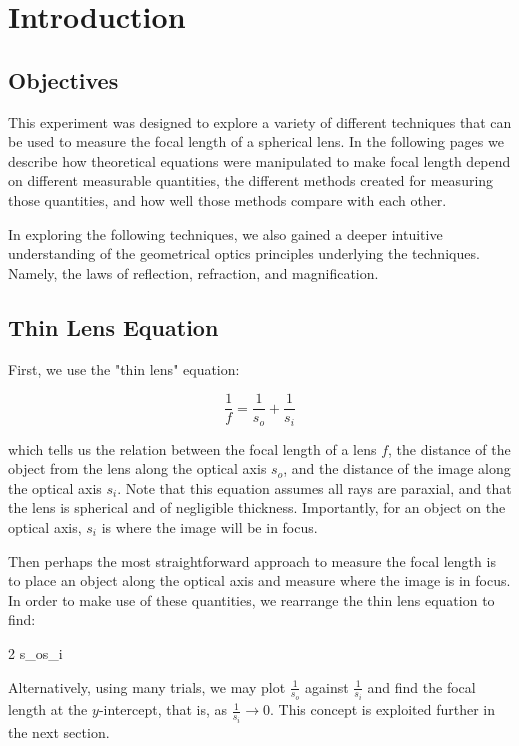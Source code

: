 \chapter{Introduction}

\section{Objectives}
This experiment was designed to explore a variety of different techniques that can be used to measure the focal length of a spherical lens. In the following pages we describe how theoretical equations were manipulated to make focal length depend on different measurable quantities, the different methods created for measuring those quantities, and how well those methods compare with each other.

In exploring the following techniques, we also gained a deeper intuitive understanding of the geometrical optics principles underlying the techniques. Namely, the laws of reflection, refraction, and magnification.

\section{Thin Lens Equation}
First, we use the "thin lens" equation:

\[\frac{1}{f} = \frac{1}{s_o} + \frac{1}{s_i}\]

which tells us the relation between the focal length of a lens $f$, the distance of the object from the lens along the optical axis $s_o$, and the distance of the image along the optical axis $s_i$. Note that this equation assumes all rays are paraxial, and that the lens is spherical and of negligible thickness. Importantly, for an object on the optical axis, $s_i$ is where the image will be in focus.

Then perhaps the most straightforward approach to measure the focal length is to place an object along the optical axis and measure where the image is in focus. In order to make use of these quantities, we rearrange the thin lens equation to find:

{2}{}
{{s_o}{s_i}}

Alternatively, using many trials, we may plot $\frac{1}{s_o}$ against $\frac{1}{s_i}$ and find the focal length at the $y$-intercept, that is, as $\frac{1}{s_i} \to 0$. This concept is exploited further in the next section.

